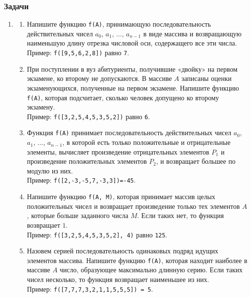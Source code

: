 \documentclass{article}
\begin{document}
\subsubsection*{Задачи}
\begin{enumerate}[label={}, leftmargin=0pt, itemindent=0pt]
\item

\begin{enumerate}[label=\arabic{enumi}.\arabic*.]
\item 
Напишите функцию \texttt{f(A)}, принимающую последовательность действительных чисел $a_0$, $a_1$, $\ldots$, $a_{n-1}$ в виде массива и возвращающую наименьшую длину отрезка числовой оси, содержащего все эти числа.
\\Пример: \texttt{f([9,5,6,2,8])} равно \texttt{7}.

\item 
При поступлении в вуз абитуриенты, получившие «двойку» на первом экзамене, ко второму не допускаются. В массиве $A$ записаны оценки экзаменующихся, полученные на первом экзамене. Напишите функцию \texttt{f(A)}, которая подсчитает, сколько человек допущено ко второму экзамену.
\\Пример: \texttt{f([3,2,5,4,5,3,5,2])} равно \texttt{6}.

\item 
Функция \texttt{f(A)} принимает последовательность действительных чисел $a_0$, $a_1$, $\ldots$, $a_{n-1}$, в которой есть только положительные и отрицательные элементы, вычисляет произведение отрицательных элементов $P_1$ и произведение положительных элементов $P_2$, и возвращает большее по модулю из них.
\\Пример: \texttt{f([2,-3,-5,7,-3,3])=-45}. 

\item 
Напишите функцию \texttt{f(A, M)}, которая принимает массив целых положительных чисел и возвращает произведение только тех элементов $A$, которые больше заданного числа $M$. Если таких нет, то функция возвращает $1$.
\\Пример: \texttt{f([3,2,5,4,5,3,5,2],\,4)} равно \texttt{125}.

\item 
Назовем серией последовательность одинаковых подряд идущих элементов массива. 
Напишите функцию \texttt{f(A)}, которая находит наиболее в массиве $A$ число, образующее максимально длинную серию. Если таких чисел несколько, то функция возвращает наименьшее из них.
\\Пример: \texttt{f([7,7,7,3,2,1,1,5,5,5]) = 5}.


\end{enumerate}
\end{enumerate}
\end{document}
